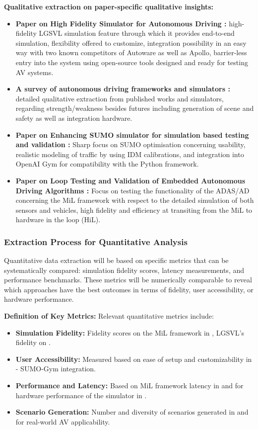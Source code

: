 \documentclass[lettersize,journal]{IEEEtran}
\begin{document}
\textbf{Qualitative extraction on paper-specific qualitative insights:}
\begin{itemize}
    \item \textbf{Paper on  High Fidelity Simulator for Autonomous Driving \cite{ref51}:} high-fidelity LGSVL simulation feature through which it provides end-to-end simulation, flexibility offered to customize, integration possibility in an easy way with two known competitors of Autoware as well as Apollo, barrier-less entry into the system using open-source tools designed and ready for testing AV systems.
    \item \textbf{A survey of autonomous driving frameworks and simulators \cite{ref52}:} detailed qualitative extraction from published works and simulators, regarding strength/weakness besides futures including generation of scene and safety as well as integration hardware.
    \item \textbf{Paper on Enhancing SUMO simulator for simulation based testing and validation \cite{ref54}:} Sharp focus on SUMO optimisation concerning usability, realistic modeling of traffic by using IDM calibrations, and integration into OpenAI Gym for compatibility with the Python framework.
    \item \textbf{Paper on Loop Testing and Validation of Embedded Autonomous Driving Algorithms \cite{ref55}:} Focus on testing the functionality of the ADAS/AD concerning the MiL framework with respect to the detailed simulation of both sensors and vehicles, high fidelity and efficiency at transiting from the MiL to hardware in the loop (HiL).
\end{itemize}

\subsubsection{Extraction Process for Quantitative Analysis}

Quantitative data extraction will be based on specific metrics that can be systematically compared: simulation fidelity scores, latency measurements, and performance benchmarks. These metrics will be numerically comparable to reveal which approaches have the best outcomes in terms of fidelity, user accessibility, or hardware performance.

\textbf{Definition of Key Metrics:} Relevant quantitative metrics include:
\begin{itemize}
    \item \textbf{Simulation Fidelity:} Fidelity scores on the MiL framework in \cite{ref55}, LGSVL's fidelity on \cite{ref51}.
    \item \textbf{User Accessibility:} Measured based on ease of setup and customizability in \cite{ref54}- SUMO-Gym integration.
    \item \textbf{Performance and Latency:} Based on MiL framework latency in \cite{ref55} and for hardware performance of the simulator in \cite{ref52}.
    \item \textbf{Scenario Generation:} Number and diversity of scenarios generated in \cite{ref52} and \cite{ref55} for real-world AV applicability.
\end{itemize}
\end{document}
